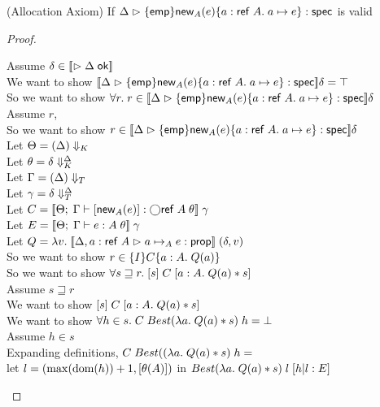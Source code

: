 \begin{lemma}{(Allocation Axiom)}
If $\judgeS{\spec{\emp}{\newref{A}{e}}{a:\reftype{A}}{a \pointsto e}}$ is valid
\end{lemma}
\begin{proof}
  \begin{tabbedproof}
    \oo Assume $\delta \in \interp{\judgeACtx{\Delta}}$ \\
    \ooo We want to show $\interp{\judgeS{\spec{\emp}{\newref{A}{e}}{a:\reftype{A}}{a \pointsto e}}}\delta = \top$ \\
    \ooo So we want to show $\forall r.\; r \in \interp{\judgeS{\spec{\emp}{\newref{A}{e}}{a:\reftype{A}}{a \pointsto e}}}\delta$ \\
    \ooo Assume $r$, \\
    \oooo So we want to show $r \in \interp{\judgeS{\spec{\emp}{\newref{A}{e}}{a:\reftype{A}}{a \pointsto e}}}\delta$ \\
    \oooo Let $\Theta = \restrictkind{\Delta}$ \\
    \oooo Let $\theta = \restricttyenv{\Delta}{\delta}$ \\
    \oooo Let $\Gamma = \restricttype{\Delta}$ \\
    \oooo Let $\gamma = \restrictvals{\Delta}{\delta}$ \\
    \oooo Let $C = \interp{\judgeE{\Gamma}{\comp{\newref{A}{e}}}{\monad{\reftype{A}}}\;\theta}\;\gamma$ \\
    \oooo Let $E = \interp{\judgeE{\Gamma}{e}{A}\;\theta}\;\gamma$ \\
    \oooo Let $Q = \semfun{v}{\interp{\judgeA[\Delta, a:\reftype{A}]{a \pointsto_A e}{\assert}}\;(\delta, v)}$ \\
    \oooo So we want to show $r \in \spec{I}{C}{a:A}{Q(a)}$ \\
    \oooo So we want to show $\forall s \sqsupseteq r.\; \basicspec{s}{C}{a:A}{Q(a)*s}$ \\
    \oooo Assume $s \sqsupseteq r$ \\
    \ooooo We want to show $\basicspec{s}{C}{a:A}{Q(a)*s}$ \\
    \ooooo We want to show $\forall h \in s.\; C\;Best(\semfun{a}{Q(a)*s})\;h = \bot$ \\
    \ooooo Assume $h \in s$ \\
    \oooooo Expanding definitions, $C\;Best((\semfun{a}{Q(a)*s})\;h = $ \\
    \oooooox let $l = (\max(\domain{h})+1, [\theta(A)])$ in $Best(\semfun{a}{Q(a)*s})\;l\;[h|l:E]$ \\

\end{tabbedproof}
\end{proof}
